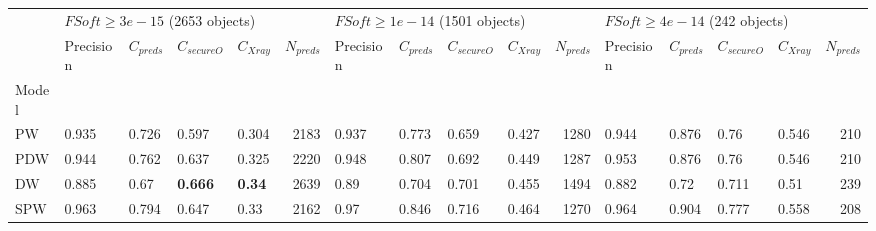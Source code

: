 \documentclass[fleqn,usenatbib]{mnras}
\begin{document}
\begin{table}
	\begin{tabular}{lllllrllllrllllr}
            \hline
            {} & \multicolumn{5}{l}{$FSoft \geq 3e-15$ (2653 objects)} & \multicolumn{5}{l}{$FSoft \geq 1e-14$ (1501 objects)} & \multicolumn{5}{l}{$FSoft \geq 4e-14$ (242 objects)} \\
            {} &                         Precision &     $C_{preds}$ &   $C_{secureO}$ &     $C_{Xray}$ & $N_{preds}$ &                         Precision &     $C_{preds}$ &   $C_{secureO}$ &      $C_{Xray}$ & $N_{preds}$ &                        Precision &     $C_{preds}$ &   $C_{secureO}$ &      $C_{Xray}$ & $N_{preds}$ \\
            Model &                                   &                 &                 &                &             &                                   &                 &                 &                 &             &                                  &                 &                 &                 &             \\
            \hline
            PW    &                             0.935 &           0.726 &           0.597 &          0.304 &        2183 &                             0.937 &           0.773 &           0.659 &           0.427 &        1280 &                            0.944 &           0.876 &            0.76 &           0.546 &         210 \\
            PDW   &                             0.944 &           0.762 &           0.637 &          0.325 &        2220 &                             0.948 &           0.807 &           0.692 &           0.449 &        1287 &                            0.953 &           0.876 &            0.76 &           0.546 &         210 \\
            DW    &                             0.885 &            0.67 &  \textbf{0.666} &  \textbf{0.34} &        2639 &                              0.89 &           0.704 &           0.701 &           0.455 &        1494 &                            0.882 &            0.72 &           0.711 &            0.51 &         239 \\
            SPW   &                             0.963 &           0.794 &           0.647 &           0.33 &        2162 &                              0.97 &           0.846 &           0.716 &           0.464 &        1270 &                            0.964 &           0.904 &           0.777 &           0.558 &         208 \\

\end{tabular}
\end{table}
\end{document}
